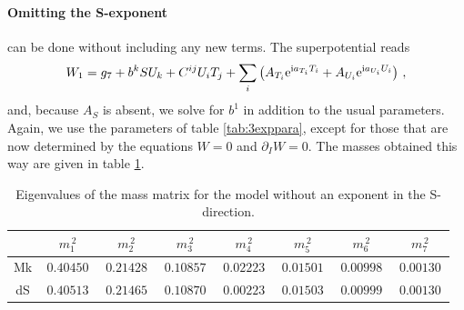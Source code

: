 \documentclass[12pt]{report}
\newcommand{\be}{\begin{equation}}
\newcommand{\ee}{\end{equation}}
\def\rmi{{\rm i}}
\def\rme{{\rm e}}
\begin{document}
\FloatBarrier
\paragraph{Omitting the S-exponent} can be done without including any new terms. The superpotential reads
\be 
W_1 = g_7 + b^k S U_k + C^{ij} U_i T_j + \sum_i \left( A_{T_i} \rme^{\rmi a_{T_i}T_i} + A_{U_i} \rme^{\rmi a_{U_i}U_i} \right)\,,
\ee
and, because $A_S$ is absent, we solve for $b^1$ in addition to the usual parameters. Again, we use the parameters of table \ref{tab:3exppara}, except for those that are now determined by the equations $W = 0$ and $\partial_I W = 0$. The masses obtained this way are given in table \ref{tab:noSmass}.
\begin{table}[htb]
\center
\begin{tabular}{|c|c|c|c|c|c|c|c|}\hline
     &$\,m_1^{\,2}\,$&$\,m_2^{\,2}\,$&$\,m_3^{\,2}\,$&$\,m_4^{\,2}\,$&$\,m_5^{\,2}\,$&$\,m_6^{\,2}\,$&$\,m_7^{\,2}\,$\\\hline
Mk & $\, 0.40450 \,$ & $\, 0.21428 \,$ & $\, 0.10857 \,$ & $\, 0.02223 \,$ & $\, 0.01501 \,$ & $\, 0.00998 \,$ & $\, 0.00130 \,$ \\\hline  
dS & $\, 0.40513 \,$ & $\, 0.21465 \,$ & $\, 0.10870 \,$ & $\, 0.00223 \,$ & $\, 0.01503 \,$ & $\, 0.00999 \,$ & $\, 0.00130 \,$ \\\hline  
\end{tabular}
\caption{Eigenvalues of the mass matrix for the model without an exponent in the S-direction.}
\label{tab:noSmass}
\end{table}

\FloatBarrier
\end{document}
